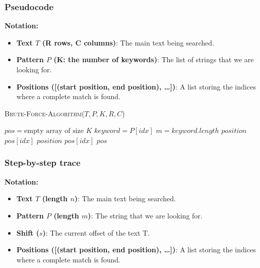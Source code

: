     \subsubsection{Pseudocode}
        \textbf{Notation:}
        \begin{itemize}
            \item \textbf{Text $T$ (R rows, C columns)}: The main text being searched.
            \item \textbf{Pattern $P$ (K: the number of keywords)}: The list of strings that we are looking for.
            \item \textbf{Positions ([(start position, end position), \ldots])}: A list storing the indices where a complete match is found.
        \end{itemize}
        \textsc{Brute-Force-Algorithm}($T, P, K, R, C$)
        \begin{algorithmic}[1]
        \State $pos = \text{empty array of size } K$
            \State $keyword = P[idx]$
            \State $m = keyword.length$
            \Statex
            \Statex
                        \State {} $position$  $pos[idx]$
                    \EndIf
                \EndFor
            \EndFor
            \Statex
            \Statex
                        \State {} $position$  $pos[idx]$
                    \EndIf
                \EndFor
            \EndFor
        \EndFor
        \State \Return $pos$
        \end{algorithmic}
    \subsubsection{Step-by-step trace\cite{cormen2022introduction}}

    \indent \textbf{Notation:}
        \begin{itemize}
            \item \textbf{Text $T$ (length $n$)}: The main text being searched.
            \item \textbf{Pattern $P$ (length $m$)}: The string that we are looking for.
            \item \textbf{Shift ($s$)}: The current offset of the text T.
            \item \textbf{Positions ([(start position, end position), \ldots])}: A list storing the indices where a complete match is found.
        \end{itemize}

